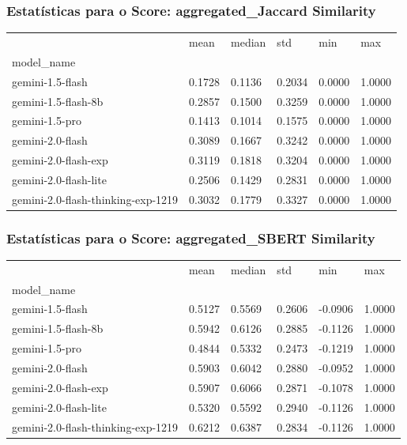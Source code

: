 \documentclass{article}%
\begin{document}
\subsubsection*{Estatísticas para o Score: aggregated\_Jaccard Similarity}%
\begin{table}[H]%
\centering%
\begin{tabular}{llllll}
\toprule
 & mean & median & std & min & max \\
model_name &  &  &  &  &  \\
\midrule
gemini-1.5-flash & 0.1728 & 0.1136 & 0.2034 & 0.0000 & 1.0000 \\
gemini-1.5-flash-8b & 0.2857 & 0.1500 & 0.3259 & 0.0000 & 1.0000 \\
gemini-1.5-pro & 0.1413 & 0.1014 & 0.1575 & 0.0000 & 1.0000 \\
gemini-2.0-flash & 0.3089 & 0.1667 & 0.3242 & 0.0000 & 1.0000 \\
gemini-2.0-flash-exp & 0.3119 & 0.1818 & 0.3204 & 0.0000 & 1.0000 \\
gemini-2.0-flash-lite & 0.2506 & 0.1429 & 0.2831 & 0.0000 & 1.0000 \\
gemini-2.0-flash-thinking-exp-1219 & 0.3032 & 0.1779 & 0.3327 & 0.0000 & 1.0000 \\
\bottomrule
\end{tabular}
%
\end{table}%
\vspace{0.5cm}%
\subsubsection*{Estatísticas para o Score: aggregated\_SBERT Similarity}%
\begin{table}[H]%
\centering%
\begin{tabular}{llllll}
\toprule
 & mean & median & std & min & max \\
model_name &  &  &  &  &  \\
\midrule
gemini-1.5-flash & 0.5127 & 0.5569 & 0.2606 & -0.0906 & 1.0000 \\
gemini-1.5-flash-8b & 0.5942 & 0.6126 & 0.2885 & -0.1126 & 1.0000 \\
gemini-1.5-pro & 0.4844 & 0.5332 & 0.2473 & -0.1219 & 1.0000 \\
gemini-2.0-flash & 0.5903 & 0.6042 & 0.2880 & -0.0952 & 1.0000 \\
gemini-2.0-flash-exp & 0.5907 & 0.6066 & 0.2871 & -0.1078 & 1.0000 \\
gemini-2.0-flash-lite & 0.5320 & 0.5592 & 0.2940 & -0.1126 & 1.0000 \\
gemini-2.0-flash-thinking-exp-1219 & 0.6212 & 0.6387 & 0.2834 & -0.1126 & 1.0000 \\
\bottomrule
\end{tabular}
%
\end{table}%
\vspace{0.5cm}%
\end{document}
